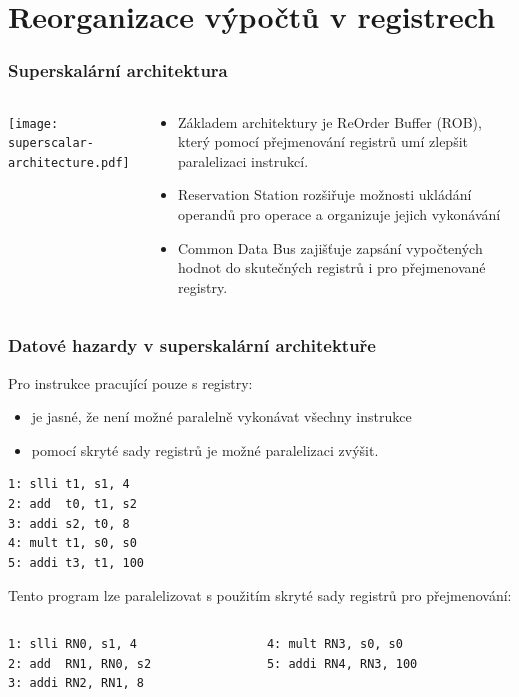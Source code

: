 \documentclass{beamer}
\begin{document}
\section{Reorganizace výpočtů v registrech}

\begin{frame}
\frametitle{Superskalární architektura}
\begin{columns}
\begin{column}{0.55\textwidth}
\texttt{[image: superscalar-architecture.pdf]}
\end{column}
\begin{column}{0.45\textwidth}
\begin{itemize}
\item Základem architektury je ReOrder Buffer (ROB), který pomocí přejmenování registrů umí zlepšit paralelizaci instrukcí.
\item Reservation Station rozšiřuje možnosti ukládání operandů pro operace a organizuje jejich vykonávání
\item Common Data Bus zajišťuje zapsání vypočtených hodnot do skutečných registrů i pro přejmenované registry.
\end{itemize}
\end{column}
\end{columns}
\end{frame}


\begin{frame}[fragile]
\frametitle{Datové hazardy v superskalární architektuře}

Pro instrukce pracující pouze s registry:
\begin{itemize}
\item je jasné, že není možné paralelně vykonávat všechny instrukce
\item pomocí skryté sady registrů je možné paralelizaci zvýšit.
\end{itemize}

\begin{verbatim}
1: slli t1, s1, 4
2: add  t0, t1, s2
3: addi s2, t0, 8
4: mult t1, s0, s0
5: addi t3, t1, 100
\end{verbatim}

Tento program lze paralelizovat s použitím skryté sady registrů pro přejmenování:

\begin{columns}[T]
\begin{column}{0.40\textwidth}
\begin{verbatim}
1: slli RN0, s1, 4
2: add  RN1, RN0, s2
3: addi RN2, RN1, 8
\end{verbatim}
\end{column}
\begin{column}{0.40\textwidth}
\begin{verbatim}
4: mult RN3, s0, s0
5: addi RN4, RN3, 100
\end{verbatim}
\end{column}
\end{columns}
\end{frame}
\end{document}

